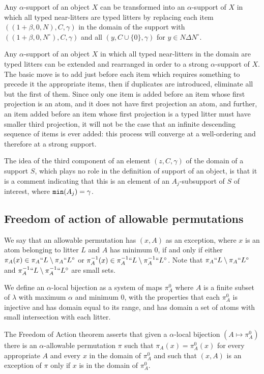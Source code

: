 \documentclass[12pt]{article}
\begin{document}
Any $\alpha$-support of an object $X$ can be transformed into an $\alpha$-support of $X$ in which all typed near-litters are typed litters by replacing each item $((1+\beta,0,N),C,\gamma)$ in the domain of the support with
$((1+\beta,0,N^\circ),C,\gamma)$ and all $(y,C \cup \{0\},\gamma)$ for $y \in N \Delta N^\circ$.

Any $\alpha$-support of an object $X$ in which all typed near-litters in the domain are typed litters can be extended and rearranged in order to a strong $\alpha$-support of $X$.  The basic move is to add just before each item which requires something to precede it the appropriate items, then if duplicates are introduced, eliminate all but the first of them.   Since only one item is added before an item whose first projection is an atom, and it does not have first projection an atom, and further, an item added before an item whose first projection is a typed litter must have smaller third projection, it will not be the case that an infinite descending sequence of items is ever added:  this process will converge at a well-ordering and therefore at a strong support.

The idea of the third component of an element $(z,C,\gamma)$ of the domain of a support $S$, which plays no role
in the definition of support of an object, is that it is a comment indicating that this is an element of an $A_j$-subsupport of $S$ of interest, where ${\tt min}(A_j)=\gamma$.

\subsection{Freedom of action of allowable permutations}

We say that an allowable permutation has $(x,A)$ as an exception, where $x$ is an atom belonging to litter $L$ and  $A$ has minimum 0, if and only if  either $\pi_A(x) \in \pi_A``L \setminus \pi_A``L^\circ$ or $\pi^{-1}_A(x) \in \pi_A^{-1}``L \setminus \pi^{-1}_A``L^\circ$.  Note that $\pi_A``L \setminus \pi_A``L^\circ$ and $\pi_A^{-1}``L \setminus \pi^{-1}_A``L^\circ$ are small sets.


We define an $\alpha$-local bijection as a system of maps $\pi^0_A$ where $A$ is a finite subset of $\lambda$ with maximum $\alpha$ and minimum 0, with the properties that each $\pi^0_A$ is injective and has domain equal to its range, and has domain a set of atoms with small intersection with each litter.

The Freedom of Action theorem asserts that given a $\alpha$-local bijection $(A \mapsto \pi^0_A)$  there is an $\alpha$-allowable permutation $\pi$ such that $\pi_A(x) = \pi^0_A(x)$ for every appropriate $A$ and every $x$ in the domain of $\pi^0_A$  and such that $(x,A)$ is an exception of $\pi$ only if $x$ is in the domain of $\pi^0_A$.
\end{document}
